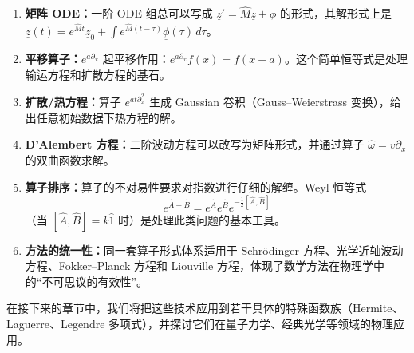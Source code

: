 \begin{enumerate}
\item \textbf{矩阵 ODE：}一阶 ODE 组总可以写成 $\underline{z}'=\hat{M}\underline{z}+\underline{\phi}$ 的形式，其解形式上是 $\underline{z}(t)=e^{\hat{M}t}\underline{z}_{0}+\int e^{\hat{M}(t-\tau)}\underline{\phi}(\tau)\,d\tau$。

\item \textbf{平移算子：}$e^{a\partial_{x}}$ 起平移作用：$e^{a\partial_{x}}f(x)=f(x+a)$。这个简单恒等式是处理输运方程和扩散方程的基石。

\item \textbf{扩散/热方程：}算子 $e^{a t\partial_{x}^{2}}$ 生成 Gaussian 卷积（Gauss--Weierstrass 变换），给出任意初始数据下热方程的解。

\item \textbf{D'Alembert 方程：}二阶波动方程可以改写为矩阵形式，并通过算子 $\hat{\omega}=v\partial_{x}$ 的双曲函数求解。

\item \textbf{算子排序：}算子的不对易性要求对指数进行仔细的解缠。Weyl 恒等式
\[
e^{\hat{A}+\hat{B}}=e^{\hat{A}}e^{\hat{B}}e^{-\frac{1}{2}[\hat{A},\hat{B}]}
\]
（当 $[\hat{A},\hat{B}]=k\hat{1}$ 时）是处理此类问题的基本工具。

\item \textbf{方法的统一性：}同一套算子形式体系适用于 Schr\"odinger 方程、光学近轴波动方程、Fokker--Planck 方程和 Liouville 方程，体现了数学方法在物理学中的``不可思议的有效性''。
\end{enumerate}

在接下来的章节中，我们将把这些技术应用到若干具体的特殊函数族（Hermite、Laguerre、Legendre 多项式），并探讨它们在量子力学、经典光学等领域的物理应用。

